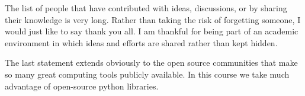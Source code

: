 \documentclass[%
oneside,                 %
final,                   %
10pt]{article}
\begin{document}
\noindent
The list of people that have contributed with ideas, discussions, or by sharing their knowledge is very long. Rather than taking the risk of forgetting someone, I would just like to say thank you all. I am thankful for being part of an academic environment in which ideas and efforts are shared rather than kept hidden.

The last statement extends obviously to the open source communities that make so many great computing tools publicly available. In this course we take much advantage of open-source python libraries.  


\end{document}
